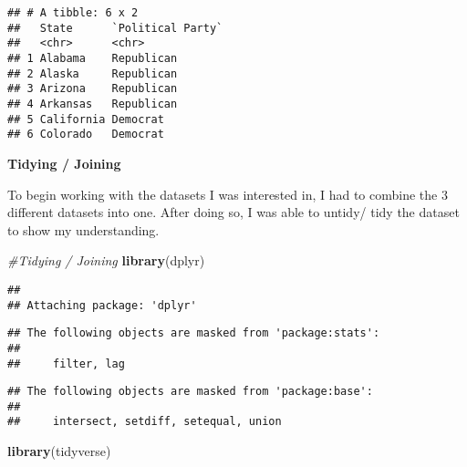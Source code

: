 \documentclass[]{article}
\newenvironment{Shaded}{\begin{snugshade}}{\end{snugshade}}
\newcommand{\CommentTok}[1]{\textcolor[rgb]{0.56,0.35,0.01}{\textit{#1}}}
\newcommand{\DataTypeTok}[1]{\textcolor[rgb]{0.13,0.29,0.53}{#1}}
\newcommand{\KeywordTok}[1]{\textcolor[rgb]{0.13,0.29,0.53}{\textbf{#1}}}
\newcommand{\NormalTok}[1]{#1}
\newcommand{\StringTok}[1]{\textcolor[rgb]{0.31,0.60,0.02}{#1}}
\begin{document}
\begin{Shaded}
\end{Shaded}

\begin{verbatim}
## # A tibble: 6 x 2
##   State      `Political Party`
##   <chr>      <chr>            
## 1 Alabama    Republican       
## 2 Alaska     Republican       
## 3 Arizona    Republican       
## 4 Arkansas   Republican       
## 5 California Democrat         
## 6 Colorado   Democrat
\end{verbatim}

\textbf{Tidying / Joining }

To begin working with the datasets I was interested in, I had to combine
the 3 different datasets into one. After doing so, I was able to untidy/
tidy the dataset to show my understanding.

\begin{Shaded}
\begin{Highlighting}[]
\CommentTok{#Tidying / Joining}
\KeywordTok{library}\NormalTok{(dplyr)}
\end{Highlighting}
\end{Shaded}

\begin{verbatim}
## 
## Attaching package: 'dplyr'
\end{verbatim}

\begin{verbatim}
## The following objects are masked from 'package:stats':
## 
##     filter, lag
\end{verbatim}

\begin{verbatim}
## The following objects are masked from 'package:base':
## 
##     intersect, setdiff, setequal, union
\end{verbatim}

\begin{Shaded}
\begin{Highlighting}[]
\KeywordTok{library}\NormalTok{(tidyverse)}
\end{Highlighting}
\end{Shaded}
\end{document}
